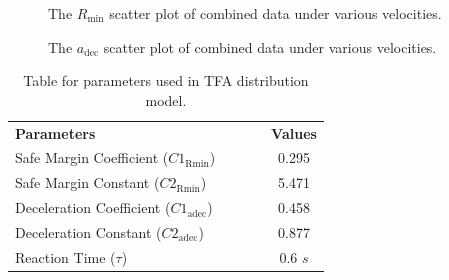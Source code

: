 \begin{figure}[htbp!]
\begin{center}
\end{center}
\caption{The $R_{\mathrm{min}}$ scatter plot of combined data under various velocities.}
\label{fig:CombRMINDifSpeed} 
\end{figure}

\begin{figure}[htbp!]
\begin{center}
\end{center}
\caption{The $a_{\mathrm{dec}}$ scatter plot of combined data under various velocities.}
\label{fig:CombADECDifSpeed} 
\end{figure}





\begin{table}[htbp]
\caption{Table for parameters used in TFA distribution model.}
\begin{center}
\label{table:parameters}
\begin{tabular}{l l l l c}
& & \\ %
\hline
\textbf{Parameters} &  & & &\textbf{Values} \\
\hline
Safe Margin Coefficient (${C1}_{\mathrm{Rmin}}$)     &  &  & &  0.295  \\
Safe Margin Constant (${C2}_{\mathrm{Rmin}}$)     &  &  & &  5.471  \\
Deceleration Coefficient (${C1}_{\mathrm{adec}}$) &  &  & & 0.458  \\
Deceleration Constant (${C2}_{\mathrm{adec}}$) &  &  & & 0.877  \\
Reaction Time ($\tau$)        &  &  & & 0.6 $s$ \\
\hline
\end{tabular}
\end{center}
\end{table}

